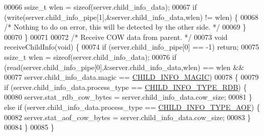 \begin{DoxyCode}
00066     ssize\_t wlen = \textcolor{keyword}{sizeof}(server.child\_info\_data);
00067     \textcolor{keywordflow}{if} (write(server.child\_info\_pipe[1],&server.child\_info\_data,wlen) != wlen) \{
00068         \textcolor{comment}{/* Nothing to do on error, this will be detected by the other side. */}
00069     \}
00070 \}
00071 
00072 \textcolor{comment}{/* Receive COW data from parent. */}
00073 \textcolor{keywordtype}{void} receiveChildInfo(\textcolor{keywordtype}{void}) \{
00074     \textcolor{keywordflow}{if} (server.child\_info\_pipe[0] == -1) \textcolor{keywordflow}{return};
00075     ssize\_t wlen = \textcolor{keyword}{sizeof}(server.child\_info\_data);
00076     \textcolor{keywordflow}{if} (read(server.child\_info\_pipe[0],&server.child\_info\_data,wlen) == wlen &&
00077         server.child\_info\_data.magic == \hyperlink{server_8h_a5486686c8ced8ece3cdd7d936efd24ac}{CHILD\_INFO\_MAGIC})
00078     \{
00079         \textcolor{keywordflow}{if} (server.child\_info\_data.process\_type == \hyperlink{server_8h_a878f18d9e3d0af58b81a17d764a81dbe}{CHILD\_INFO\_TYPE\_RDB}) \{
00080             server.stat\_rdb\_cow\_bytes = server.child\_info\_data.cow\_size;
00081         \} \textcolor{keywordflow}{else} \textcolor{keywordflow}{if} (server.child\_info\_data.process\_type == 
      \hyperlink{server_8h_a9b759a9f6c6f785433572ab86a3ed214}{CHILD\_INFO\_TYPE\_AOF}) \{
00082             server.stat\_aof\_cow\_bytes = server.child\_info\_data.cow\_size;
00083         \}
00084     \}
00085 \}
\end{DoxyCode}
